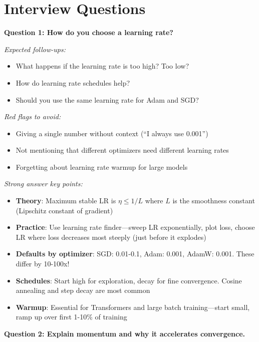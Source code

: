 \documentclass[../../main.tex]{subfiles}
\begin{document}
\section*{Interview Questions}
\begin{interviewquestions}

\textbf{Question 1: How do you choose a learning rate?}

\textit{Expected follow-ups:}
\begin{itemize}
    \item What happens if the learning rate is too high? Too low?
    \item How do learning rate schedules help?
    \item Should you use the same learning rate for Adam and SGD?
\end{itemize}

\textit{Red flags to avoid:}
\begin{itemize}
    \item Giving a single number without context (``I always use 0.001'')
    \item Not mentioning that different optimizers need different learning rates
    \item Forgetting about learning rate warmup for large models
\end{itemize}

\textit{Strong answer key points:}
\begin{itemize}
    \item \textbf{Theory}: Maximum stable LR is $\eta \leq 1/L$ where $L$ is the smoothness constant (Lipschitz constant of gradient)
    \item \textbf{Practice}: Use learning rate finder---sweep LR exponentially, plot loss, choose LR where loss decreases most steeply (just before it explodes)
    \item \textbf{Defaults by optimizer}: SGD: 0.01-0.1, Adam: 0.001, AdamW: 0.001. These differ by 10-100x!
    \item \textbf{Schedules}: Start high for exploration, decay for fine convergence. Cosine annealing and step decay are most common
    \item \textbf{Warmup}: Essential for Transformers and large batch training---start small, ramp up over first 1-10\% of training
\end{itemize}

\vspace{0.5em}
\textbf{Question 2: Explain momentum and why it accelerates convergence.}


\end{interviewquestions}
\end{document}
